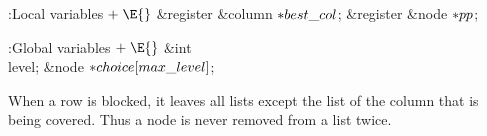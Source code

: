 \B{}:Local variables\X${}\mathrel+\E{}$\6
\&{register} \&{column} ${}{*}\\{best\_col}{}$;\6
\&{register} \&{node} ${}{*}\\{pp}{}$;\par
\fi

\B{}:Global variables\X${}\mathrel+\E{}$\6
\&{int} \\{level};\6
\&{node} ${}{*}\\{choice}[\\{max\_level}]{}$;\par
\fi

When a row is blocked, it leaves all lists except the list
of the
column that is being covered. Thus a node is never removed from a list
twice.

